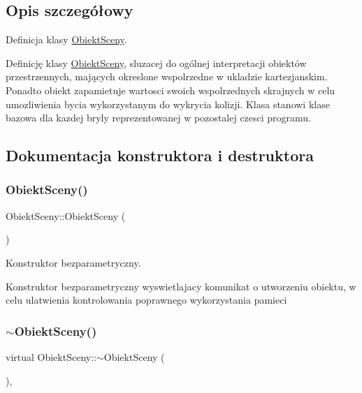 \subsection{Opis szczegółowy}
Definicja klasy \hyperlink{classObiektSceny}{Obiekt\+Sceny}. 

Definicję klasy \hyperlink{classObiektSceny}{Obiekt\+Sceny}, sluzacej do ogólnej interpretacji obiektów przestrzennych, mających okreslone wspolrzedne w ukladzie kartezjanskim. Ponadto obiekt zapamietuje wartosci swoich wspolrzednych skrajnych w celu umozliwienia bycia wykorzystanym do wykrycia kolizji. Klasa stanowi klase bazowa dla kazdej bryly reprezentowanej w pozostalej czesci programu. 

\subsection{Dokumentacja konstruktora i destruktora}
\mbox{\label{classObiektSceny_a3ac6cda78772edd23c39b3827c1695d8}} 
\subsubsection{\texorpdfstring{Obiekt\+Sceny()}{ObiektSceny()}}
{\footnotesize\ttfamily Obiekt\+Sceny\+::\+Obiekt\+Sceny (\begin{DoxyParamCaption}{ }\end{DoxyParamCaption})\hspace{0.3cm}{\ttfamily [inline]}}



Konstruktor bezparametryczny. 

Konstruktor bezparametryczny wyswietlajacy komunikat o utworzeniu obiektu, w celu ulatwienia kontrolowania poprawnego wykorzystania pamieci \mbox{\label{classObiektSceny_ab34aec7f37d73f5b1cc4d3268ac39af9}} 
\subsubsection{\texorpdfstring{$\sim$\+Obiekt\+Sceny()}{~ObiektSceny()}}
{\footnotesize\ttfamily virtual Obiekt\+Sceny\+::$\sim$\+Obiekt\+Sceny (\begin{DoxyParamCaption}{ }\end{DoxyParamCaption})\hspace{0.3cm}{\ttfamily [inline]}, {\ttfamily [virtual]}}




